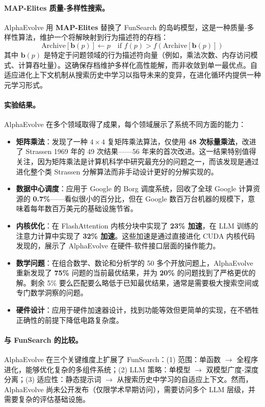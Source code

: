 \paragraph{MAP-Elites 质量-多样性搜索。}
AlphaEvolve 用 \textbf{MAP-Elites} 替换了 FunSearch 的岛屿模型，这是一种质量-多样性算法，维护一个将解映射到行为描述符的存档：
\begin{equation}
\text{Archive}[\mathbf{b}(p)] \leftarrow p \quad \text{if } f(p) > f(\text{Archive}[\mathbf{b}(p)])
\end{equation}
其中 $\mathbf{b}(p)$ 是特定于问题领域的行为描述符向量（例如，乘法次数、内存访问模式、计算吞吐量）。这确保存档维护多样化高性能解，而非收敛到单一最优点。自适应进化上下文机制从搜索历史中学习以指导未来的变异，在进化循环内提供一种元学习形式。

\paragraph{实验结果。}
AlphaEvolve 在多个领域取得了成果，每个领域展示了系统不同方面的能力：
\begin{itemize}
    \item \textbf{矩阵乘法}：发现了一种 $4 \times 4$ 复矩阵乘法算法，仅使用 \textbf{48 次标量乘法}，改进了 Strassen 1969 年的 49 次结果——56 年来的首次改进。这一结果特别值得关注，因为矩阵乘法是计算机科学中研究最充分的问题之一，而该发现是通过进化整个类 Strassen 分解算法而非手动设计更好的分解实现的。
    \item \textbf{数据中心调度}：应用于 Google 的 Borg 调度系统，回收了全球 Google 计算资源的 \textbf{0.7\%}——看似很小的百分比，但在 Google 数百万台机器的规模下，意味着每年数百万美元的基础设施节省。
    \item \textbf{内核优化}：在 FlashAttention 内核分块中实现了 \textbf{23\% 加速}，在 LLM 训练的注意力计算中实现了 \textbf{32\% 加速}。这些加速是通过直接进化 CUDA 内核代码发现的，展示了 AlphaEvolve 在硬件-软件接口层面的操作能力。
    \item \textbf{数学问题}：在组合数学、数论和分析学的 50 多个开放问题上，AlphaEvolve 重新发现了 \textbf{75\%} 问题的当前最优结果，并为 \textbf{20\%} 的问题找到了严格更优的解。剩余 5\% 要么匹配要么略低于已知最优结果，通常是需要极大搜索空间或专门数学洞察的问题。
    \item \textbf{硬件设计}：应用于硬件加速器设计，找到功能等效但更简单的实现，在不牺牲正确性的前提下降低电路复杂度。
\end{itemize}

\paragraph{与 FunSearch 的比较。}
AlphaEvolve 在三个关键维度上扩展了 FunSearch：(1) 范围：单函数 $\rightarrow$ 全程序进化，能够优化复杂的多组件系统；(2) LLM 策略：单模型 $\rightarrow$ 双模型广度-深度分离；(3) 适应性：静态提示词 $\rightarrow$ 从搜索历史中学习的自适应上下文。然而，AlphaEvolve 尚未公开发布（仅限学术早期访问），需要访问多个 LLM 层级，并需要复杂的评估基础设施。



